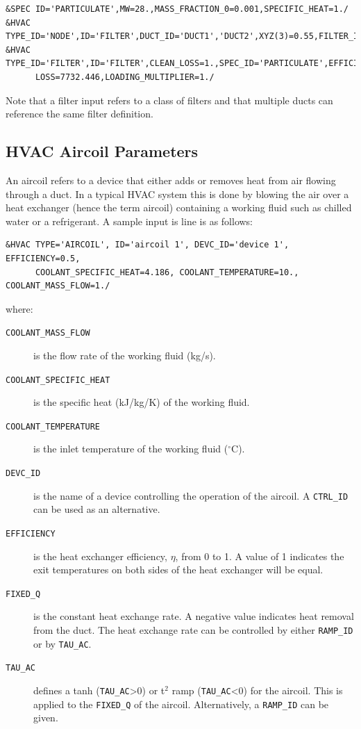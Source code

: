 \documentclass[11pt]{book}
\newcommand{\ct}{\tt\small}
\begin{document}
\footnotesize
\begin{verbatim}
&SPEC ID='PARTICULATE',MW=28.,MASS_FRACTION_0=0.001,SPECIFIC_HEAT=1./
&HVAC TYPE_ID='NODE',ID='FILTER',DUCT_ID='DUCT1','DUCT2',XYZ(3)=0.55,FILTER_ID='FILTER'/
&HVAC TYPE_ID='FILTER',ID='FILTER',CLEAN_LOSS=1.,SPEC_ID='PARTICULATE',EFFICIENCY=1.,
      LOSS=7732.446,LOADING_MULTIPLIER=1./
\end{verbatim}\normalsize

Note that a filter input refers to a class of filters and that multiple ducts can reference the same filter definition.

\subsection{HVAC Aircoil Parameters}
\label{info:HVACaircoil}

An aircoil refers to a device that either adds or removes heat from air flowing through a duct.  In a typical HVAC system this is done by blowing the air over a heat exchanger (hence the term aircoil) containing a working fluid such as chilled water or a refrigerant.  A sample input is line is as follows:

\footnotesize
\begin{verbatim}
&HVAC TYPE='AIRCOIL', ID='aircoil 1', DEVC_ID='device 1', EFFICIENCY=0.5,
      COOLANT_SPECIFIC_HEAT=4.186, COOLANT_TEMPERATURE=10., COOLANT_MASS_FLOW=1./
\end{verbatim}\normalsize

\noindent where:

\begin{description}
\item[{\ct COOLANT\_MASS\_FLOW}] is the flow rate of the working fluid (kg/s).
\item[{\ct COOLANT\_SPECIFIC\_HEAT}] is the specific heat (kJ/kg/K) of the working fluid.
\item[{\ct COOLANT\_TEMPERATURE}] is the inlet temperature of the working fluid ($^\circ$C).
\item[{\ct DEVC\_ID}] is the name of a device controlling the operation of the aircoil. A {\ct CTRL\_ID} can be used as an alternative.
\item[{\ct EFFICIENCY}] is the heat exchanger efficiency, $\eta$, from 0 to 1.  A value of 1 indicates the exit temperatures on both sides of the heat exchanger will be equal.
\item[{\ct FIXED\_Q}] is the constant heat exchange rate. A negative value indicates heat removal from the duct.  The heat exchange rate can be controlled by either {\ct RAMP\_ID} or by {\ct TAU\_AC}.
\item[{\ct TAU\_AC}]  defines a tanh ({\ct TAU\_AC}>0) or t$^2$ ramp ({\ct TAU\_AC}<0) for the aircoil.  This is applied to the {\ct FIXED\_Q} of the aircoil. Alternatively, a {\ct RAMP\_ID} can be given.
\end{description}
\end{document}
